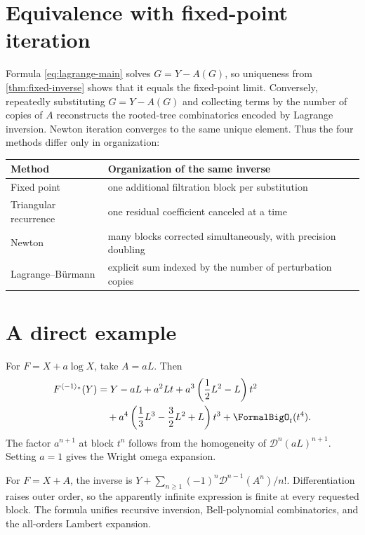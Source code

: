 \documentclass[11pt,oneside]{book}
\theoremstyle{definition}
\theoremstyle{remark}
\newcommand{\D}{\mathcal D}
\newcommand{\compinv}{^{\langle-1\rangle_{\circ}}}
\begin{document}
\section{Equivalence with fixed-point iteration}
Formula \eqref{eq:lagrange-main} solves
$G=Y-A(G)$, so uniqueness from \cref{thm:fixed-inverse} shows that it equals
the fixed-point limit.  Conversely, repeatedly substituting
$G=Y-A(G)$ and collecting terms by the number of copies of $A$ reconstructs
the rooted-tree combinatorics encoded by Lagrange inversion.  Newton iteration
converges to the same unique element.  Thus the four methods differ only in
organization:
\begin{center}
\begin{tabularx}{0.95\textwidth}{@{}lX@{}}
\toprule
Method & Organization of the same inverse \\
\midrule
Fixed point & one additional filtration block per substitution \\
Triangular recurrence & one residual coefficient canceled at a time \\
Newton & many blocks corrected simultaneously, with precision doubling \\
Lagrange--B\"urmann & explicit sum indexed by the number of perturbation copies \\
\bottomrule
\end{tabularx}
\end{center}

\section{A direct example}
For $F=X+a\log X$, take $A=aL$.  Then
\begin{align*}
 F\compinv(Y)
 &=Y-aL+a^2Lt
 +a^3\left(\frac12L^2-L\right)t^2\\
 &\quad+a^4\left(\frac13L^3-\frac32L^2+L\right)t^3
 +\FormalBigO_t(t^4).
\end{align*}
The factor $a^{n+1}$ at block $t^n$ follows from the homogeneity of
$\D^{n}(aL)^{n+1}$.  Setting $a=1$ gives the Wright omega expansion.

\begin{summarybox}
For $F=X+A$, the inverse is
$Y+\sum_{n\ge1}(-1)^n\D^{n-1}(A^n)/n!$.  Differentiation raises outer order,
so the apparently infinite expression is finite at every requested block.
The formula unifies recursive inversion, Bell-polynomial combinatorics, and
the all-orders Lambert expansion.
\end{summarybox}
\end{document}
